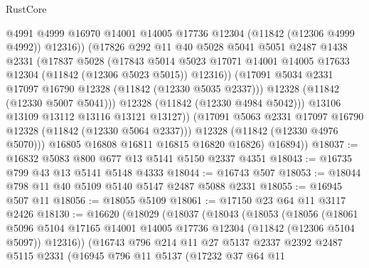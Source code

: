 \begin{lexlean}{RustCore}
\begin{coremodule}
                      @4991
                      @4999
                      @16970
                      @14001
                      @14005
                      @17736
                      @12304
                      (@11842 (@12306 @4999 @4992))
                      @12316))
                  (@17826
                    @292
                    @11
                    @40
                    @5028
                    @5041
                    @5051
                    @2487
                    @1438
                    @2331
                    (@17837
                      @5028
                      (@17843
                        @5014
                        @5023
                        @17071
                        @14001
                        @14005
                        @17633
                        @12304
                        (@11842 (@12306 @5023 @5015))
                        @12316))
                    (@17091 @5034 @2331 @17097 @16790 @12328 (@11842 (@12330 @5035 @2337)))
                    @12328
                    (@11842 (@12330 @5007 @5041)))
                  @12328
                  (@11842 (@12330 @4984 @5042)))
                @13106
                @13109
                @13112
                @13116
                @13121
                @13127))
            (@17091 @5063 @2331 @17097 @16790 @12328 (@11842 (@12330 @5064 @2337)))
            @12328
            (@11842 (@12330 @4976 @5070)))
          @16805
          @16808
          @16811
          @16815
          @16820
          @16826)
        @16894))
@18037 := @16832 @5083 @800 @677 @13 @5141 @5150 @2337 @4351
@18043 := @16735 @799 @43 @13 @5141 @5148 @4333
@18044 := @16743 @507
@18053 := @18044 @798 @11 @40 @5109 @5140 @5147 @2487 @5088 @2331
@18055 := @16945 @507 @11
@18056 := @18055 @5109
@18061 := @17150 @23 @64 @11 @3117 @2426
@18130 := @16620
    (@18029
      (@18037
        (@18043
          (@18053
            (@18056
              (@18061
                @5096
                @5104
                @17165
                @14001
                @14005
                @17736
                @12304
                (@11842 (@12306 @5104 @5097))
                @12316))
            (@16743
              @796
              @214
              @11
              @27
              @5137
              @2337
              @2392
              @2487
              @5115
              @2331
              (@16945
                @796
                @11
                @5137
                (@17232
                  @37
                  @64
                  @11

\end{coremodule}
\end{lexlean}

